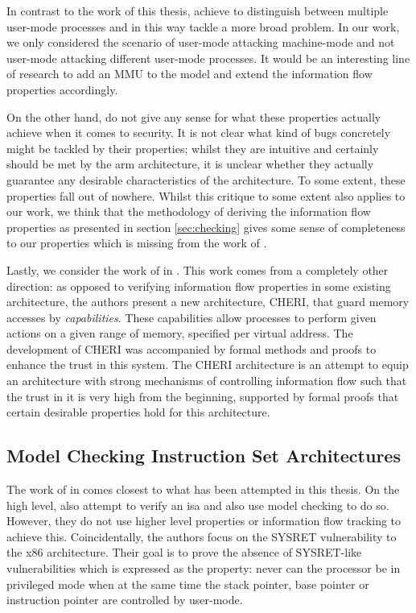 In contrast to the work of this thesis, \citeauthor{KhakpourSD13} achieve to distinguish between multiple user-mode processes and in this way tackle a more broad problem.
In our work, we only considered the scenario of user-mode attacking machine-mode and not user-mode attacking different user-mode processes.
It would be an interesting line of research to add an MMU to the model and extend the information flow properties accordingly.

On the other hand, \citeauthor{KhakpourSD13} do not give any sense for what these properties actually achieve when it comes to security.
It is not clear what kind of bugs concretely might be tackled by their properties; whilst they are intuitive and certainly should be met by the \gls{arm} architecture, it is unclear whether they actually guarantee any desirable characteristics of the architecture.
To some extent, these properties fall out of nowhere.
Whilst this critique to some extent also applies to our work, we think that the methodology of deriving the information flow properties as presented in section \ref{sec:checking} gives some sense of completeness to our properties which is missing from the work of \citeauthor{KhakpourSD13}.

Lastly, we consider the work of \citeauthor{Nienhuis19} in  \cite{Nienhuis19}.
This work comes from a completely other direction: as opposed to verifying information flow properties in some existing architecture, the authors present a new architecture, CHERI, that guard memory accesses by \textit{capabilities}.
These capabilities allow processes to perform given actions on a given range of memory, specified per virtual address.
The development of CHERI was accompanied by formal methods and proofs to enhance the trust in this system.
The CHERI architecture is an attempt to equip an architecture with strong mechanisms of controlling information flow such that the trust in it is very high from the beginning, supported by formal proofs that certain desirable properties hold for this architecture.

\subsection{Model Checking Instruction Set Architectures}

The work of \citeauthor{BradfieldS16} in  \cite{BradfieldS16} comes closest to what has been attempted in this thesis.
On the high level, \citeauthor{BradfieldS16} also attempt to verify an \gls{isa} and also use model checking to do so.
However, they do not use higher level properties or information flow tracking to achieve this.
Coincidentally, the authors focus on the SYSRET vulnerability to the x86 architecture.
Their goal is to prove the absence of SYSRET-like vulnerabilities which is expressed as the property: never can the processor be in privileged mode when at the same time the stack pointer, base pointer or instruction pointer are controlled by user-mode.

